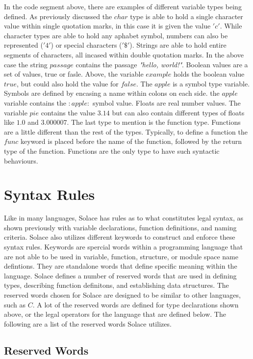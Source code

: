 \documentclass{article}
\begin{document}
In the code segment above, there are examples of different variable types being defined. As previously discussed the $char$ type is able to hold a single character value
within single quotation marks, in this case it is given the value $'c'$. While character types are able to hold any aphabet symbol, numbers can also be represented ($'4'$)
or special characters ($'\$'$). Strings are able to hold entire segments of characters, all incased within double quotation marks. In the above case the string $passage$
contains the passage \textit{"hello, world!"}. Boolean values are a set of values, true or fasle. Above, the variable $example$ holds the boolean value $true$, but could also
hold the value for $false$. The $apple$ is a symbol type variable. Symbols are defined by encasing a name within colons on each side. the $apple$ variable contains the $:apple:$
symbol value. Floats are real number values. The variable $pie$ contains the value $3.14$ but can also contain different types of floats like $1.0$ and $3.000007$. The last 
type to mention is the function type. Functions are a little different than the rest of the types. Typically, to define a function the $func$ keyword is placed before the
name of the function, followed by the return type of the function. Functions are the only type to have such syntactic behaviours.


\section{Syntax Rules}

Like in many languages, Solace has rules as to what constitutes legal syntax, as shown previously with variable declarations, function definitions, and naming criteria. Solace
also utilizes different keywords to construct and enforce these syntax rules. Keywords are spercial words within a programming language that are not able to be used in variable,
function, structure, or module space name defintions. They are standalone words that define specific meaning within the language.
Solace defines a number of reserved words that are used in defining types, describing function definitons, and establishing data structures. The reserved words chosen
for Solace are designed to be similar to other languages, such as $C$. A lot of the reserved words are defined for type declarations shown above, or the legal operators for the 
language that are defined below. The following are a list of the reserved words Solace utilizes.


\subsection{Reserved Words}
\end{document}
